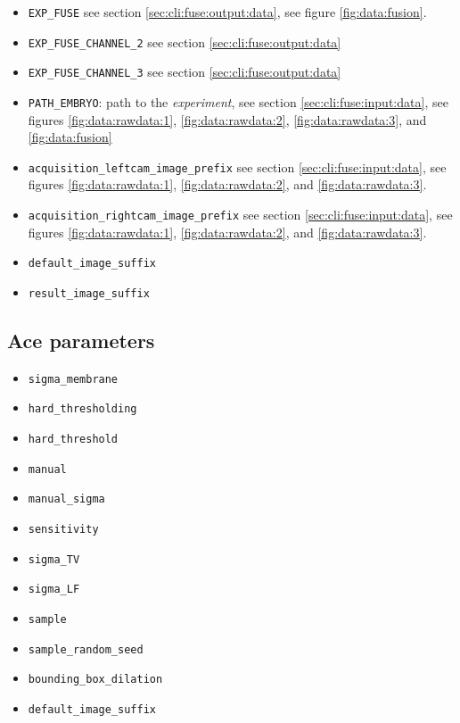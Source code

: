 \begin{itemize}
\item \texttt{EXP\_FUSE} 
see section \ref{sec:cli:fuse:output:data},
see figure \ref{fig:data:fusion}.
\item \texttt{EXP\_FUSE\_CHANNEL\_2} 
see section \ref{sec:cli:fuse:output:data}
\item \texttt{EXP\_FUSE\_CHANNEL\_3} 
see section \ref{sec:cli:fuse:output:data}
\item \texttt{PATH\_EMBRYO}: path to the \textit{experiment}, 
see section \ref{sec:cli:fuse:input:data},
see figures \ref{fig:data:rawdata:1}, 
\ref{fig:data:rawdata:2}, 
\ref{fig:data:rawdata:3}, and
\ref{fig:data:fusion}
\item \texttt{acquisition\_leftcam\_image\_prefix}  
see section \ref{sec:cli:fuse:input:data},
see figures \ref{fig:data:rawdata:1}, 
\ref{fig:data:rawdata:2}, 
and \ref{fig:data:rawdata:3}.
\item \texttt{acquisition\_rightcam\_image\_prefix}  
see section \ref{sec:cli:fuse:input:data},
see figures \ref{fig:data:rawdata:1}, 
\ref{fig:data:rawdata:2}, 
and \ref{fig:data:rawdata:3}.
\item \texttt{default\_image\_suffix}
\item \texttt{result\_image\_suffix}
\end{itemize}


\subsection{Ace parameters}
\label{sec:cli:parameters:ace}

\begin{itemize}
\itemsep -0.5ex
\item \texttt{sigma\_membrane}
\item \texttt{hard\_thresholding}
\item \texttt{hard\_threshold}
\item \texttt{manual}
\item \texttt{manual\_sigma}
\item \texttt{sensitivity}
\item \texttt{sigma\_TV}
\item \texttt{sigma\_LF}
\item \texttt{sample}
\item \texttt{sample\_random\_seed}
\item \texttt{bounding\_box\_dilation}
\item \texttt{default\_image\_suffix}
\end{itemize}



